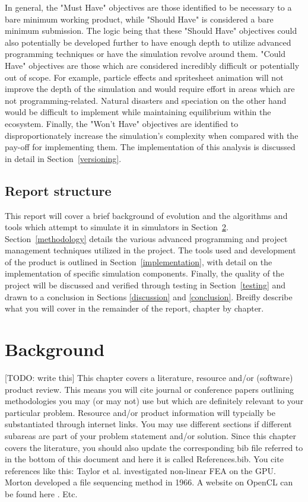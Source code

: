 \documentclass[a4paper, oneside, 11pt]{report}
\begin{document}
In general, the "Must Have" objectives are those identified to be necessary to a bare minimum working product, while "Should Have" is considered a bare minimum submission. The logic being that these "Should Have" objectives could also potentially be developed further to have enough depth to utilize advanced programming techniques or have the simulation revolve around them. "Could Have" objectives are those which are considered incredibly difficult or potentially out of scope. For example, particle effects and spritesheet animation will not improve the depth of the simulation and would require effort in areas which are not programming-related. Natural disasters and speciation on the other hand would be difficult to implement while maintaining equilibrium within the ecosystem. Finally, the "Won't Have" objectives are identified to disproportionately increase the simulation's complexity when compared with the pay-off for implementing them. The implementation of this analysis is discussed in detail in Section~\ref{versioning}.

\section{Report structure}
This report will cover a brief background of evolution and the algorithms and tools which attempt to simulate it in simulators in Section~\ref{background}. Section~\ref{methodology} details the various advanced programming and project management techniques utilized in the project. The tools used and development of the product is outlined in Section~\ref{implementation}, with detail on the implementation of specific simulation components. Finally, the quality of the project will be discussed and verified through testing in Section~\ref{testing} and drawn to a conclusion in Sections \ref{discussion} and \ref{conclusion}.
 Breifly describe what you will cover in the remainder of the report, chapter by chapter.

\chapter{Background}\label{background}
[TODO: write this]
 This chapter covers a literature, resource and/or (software) product review. This means you will cite journal or conference papers outlining methodologies you may (or may not) use but which are definitely relevant to your particular problem. Resource and/or product information will typcially be substantiated through internet links. 
You may use different sections if different subareas are part of your problem statement and/or solution. 
Since this chapter covers the literature, you should also update the corresponding bib file referred to in the bottom of this document and here it is called References.bib.
You cite references like this: Taylor et al. \cite{Taylor:2007} investigated non-linear FEA on the GPU. Morton \cite{Morton:1966} developed a file sequencing method in 1966. A website on OpenCL can be found here \cite{Soos:2012}. Etc.
\end{document}
